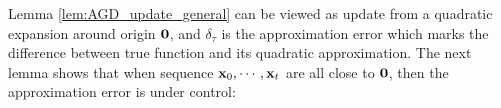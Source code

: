 Lemma \ref{lem:AGD_update_general} can be viewed as update from a quadratic expansion around origin $\mathbf{0}$, and $\delta_\tau$ is the approximation error which marks the difference between true function and its quadratic approximation.
The next lemma shows that when sequence $\mathbf{x}_0, \cdots, \mathbf{x}_t$ are all close to $\mathbf{0}$, then the approximation error is under control:








